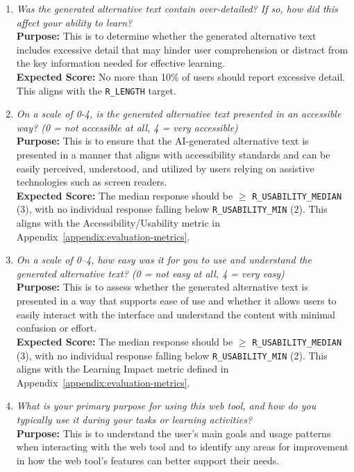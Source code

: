 \documentclass[12pt, titlepage]{article}
\begin{document}
\begin{enumerate}[label=UA-Q \arabic*., wide=0pt, leftmargin=*]
  \item \emph{Was the generated alternative text contain over-detailed?
      If so, how did this affect
    your ability to learn?}\\[2mm]
    {\bf Purpose:} This is to determine whether the generated
    alternative text includes excessive detail that may hinder user
    comprehension or distract from the key information needed for
    effective learning. \\
    {\bf Expected Score:} No more than 10\% of users should report excessive detail. This aligns with the \texttt{R\_LENGTH} target.

  \item \emph{On a scale of 0-4, is the generated alternative text
      presented in an accessible way? (0 = not accessible at all, 4 =
    very accessible)}\\[2mm]
    {\bf Purpose:} This is to ensure that the AI-generated alternative
    text is presented in a manner that aligns with accessibility standards and
    can be easily perceived, understood, and utilized by users relying
    on assistive technologies such as screen readers. \\
    {\bf Expected Score:} The median response should be $\geq$ \texttt{R\_USABILITY\_MEDIAN} (3), with no individual response falling below \texttt{R\_USABILITY\_MIN} (2). This aligns with the Accessibility/Usability metric in Appendix~\ref{appendix:evaluation-metrics}.

  \item \emph{On a scale of 0–4, how easy was it for you to use and
      understand the generated alternative text? (0 = not easy at all, 4
    = very easy)}\\[2mm]
    {\bf Purpose:} This is to assess whether the generated alternative
    text is presented in a way that supports ease of use and whether it
    allows users to easily interact with
    the interface and understand the content with minimal confusion or effort.\\
    {\bf Expected Score:} The median response should be $\geq$ \texttt{R\_USABILITY\_MEDIAN} (3), with no individual response falling below \texttt{R\_USABILITY\_MIN} (2). This aligns with the Learning Impact metric defined in Appendix~\ref{appendix:evaluation-metrics}.

  \item \emph{What is your primary purpose for using this web tool, and
      how do you typically use it during your tasks or learning
    activities?}\\[2mm]
    {\bf Purpose:} This is to understand the user’s main goals and
    usage patterns when interacting with the web tool and to identify
    any areas for improvement in how the web tool's features
    can better support their needs.


\end{enumerate}
\end{document}
